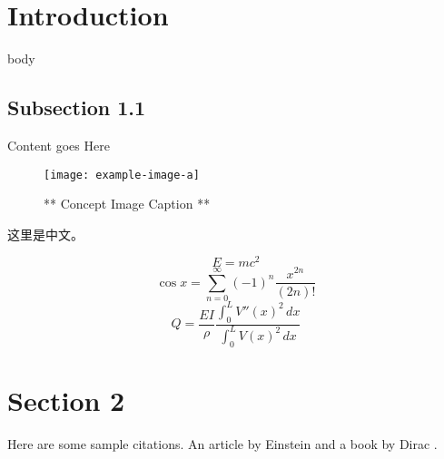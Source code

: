 \graphicspath{{Images/}}

\section{Introduction}
body
    \subsection{Subsection 1.1}

    Content goes Here


\begin{figure}[h]
    \centering
    \texttt{[image: example-image-a]}
    \caption{** Concept Image Caption **}
    \label{fig:my_label}
\end{figure}


这里是中文。

\begin{equation}
    E = mc^2
\end{equation}
\begin{equation}
    \cos{x} = \sum_{n=0}^{\infty} (-1)^n \frac{x^{2n}}{(2n)!}
\end{equation}
\begin{equation}
    Q = \frac{EI}{\rho}\frac{\int_0^L {V''(x)}^2 \,dx}{\int_0^L {V(x)}^2 \,dx}
\end{equation}

\section{Section 2}
Here are some sample citations. An article by Einstein \cite{einstein} and a book by Dirac \cite{noauthor_nsa_nodate}.
